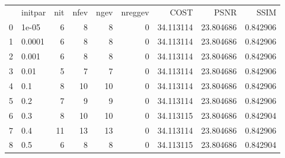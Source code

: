 \begin{tabular}{llrrrrrrr}
 & initpar & nit & nfev & ngev & nreggev & COST & PSNR & SSIM \\
0 & 1e-05 & 6 & 8 & 8 & 0 & 34.113114 & 23.804686 & 0.842906 \\
1 & 0.0001 & 6 & 8 & 8 & 0 & 34.113114 & 23.804686 & 0.842906 \\
2 & 0.001 & 6 & 8 & 8 & 0 & 34.113114 & 23.804686 & 0.842906 \\
3 & 0.01 & 5 & 7 & 7 & 0 & 34.113114 & 23.804686 & 0.842906 \\
4 & 0.1 & 8 & 10 & 10 & 0 & 34.113114 & 23.804686 & 0.842906 \\
5 & 0.2 & 7 & 9 & 9 & 0 & 34.113114 & 23.804686 & 0.842906 \\
6 & 0.3 & 8 & 10 & 10 & 0 & 34.113115 & 23.804686 & 0.842904 \\
7 & 0.4 & 11 & 13 & 13 & 0 & 34.113114 & 23.804686 & 0.842906 \\
8 & 0.5 & 6 & 8 & 8 & 0 & 34.113115 & 23.804686 & 0.842904 \\
\end{tabular}

